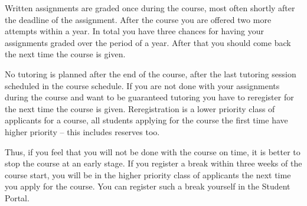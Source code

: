 Written assignments are graded once during the course, most often shortly after 
the deadline of the assignment.
After the course you are offered two more attempts within a year.
In total you have three chances for having your assignments graded over the 
period of a year.
After that you should come back the next time the course is given.

No tutoring is planned after the end of the course, \ie after the last 
tutoring session scheduled in the course schedule.
If you are not done with your assignments during the course and want to be 
guaranteed tutoring you have to reregister for the next time the course is 
given.
Reregistration is a lower priority class of applicants for a course, all 
students applying for the course the first time have higher priority -- this 
includes reserves too.


Thus, if you feel that you will not be done with the course on time, it is 
better to stop the course at an early stage.
If you register a break within three weeks of the course start, you will be in 
the higher priority class of applicants the next time you apply for the course.
You can register such a break yourself in the Student Portal.


\printbibliography{}
